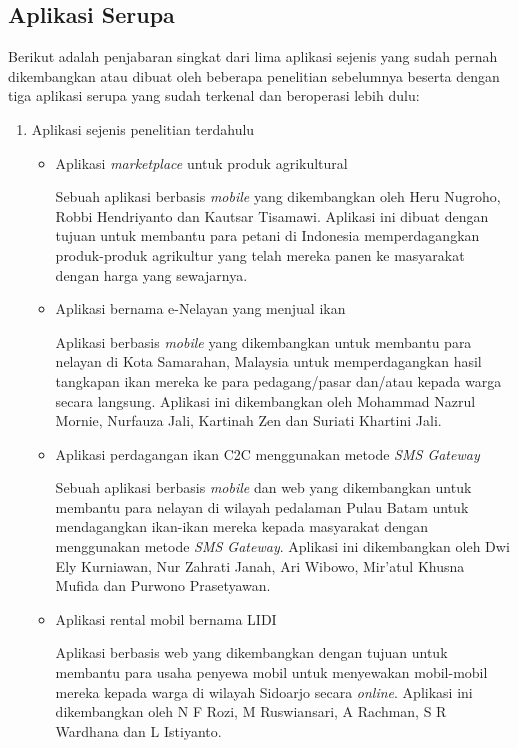 \documentclass[a4paper]{article}
\newcommand{\subbab}[1]{%
    \subsection{#1}%
    \setcounter{figure}{0}
    \setcounter{table}{0}
}
\begin{document}
\subbab{Aplikasi Serupa}
Berikut adalah penjabaran singkat dari lima aplikasi sejenis yang sudah pernah dikembangkan atau dibuat oleh beberapa penelitian sebelumnya beserta dengan tiga aplikasi serupa yang sudah terkenal dan beroperasi lebih dulu:

\begin{enumerate}
    \item Aplikasi sejenis penelitian terdahulu
    
    \begin{itemize}
        \item Aplikasi \textit{marketplace} untuk produk agrikultural
        
        Sebuah aplikasi berbasis \textit{mobile} yang dikembangkan oleh Heru Nugroho, Robbi Hendriyanto dan Kautsar Tisamawi. Aplikasi ini dibuat dengan tujuan untuk membantu para petani di Indonesia memperdagangkan produk-produk agrikultur yang telah mereka panen ke masyarakat dengan harga yang sewajarnya\autocite{agriculture-marketplace}. 
    
        \item Aplikasi bernama e-Nelayan yang menjual ikan
        
        Aplikasi berbasis \textit{mobile} yang dikembangkan untuk membantu para nelayan di Kota Samarahan, Malaysia untuk memperdagangkan hasil tangkapan ikan mereka ke para pedagang/pasar dan/atau kepada warga secara langsung. Aplikasi ini dikembangkan oleh Mohammad Nazrul Mornie, Nurfauza Jali, Kartinah Zen dan Suriati Khartini Jali\autocite[1-10]{fishes-marketplace}.
    
        \item Aplikasi perdagangan ikan C2C menggunakan metode \textit{SMS Gateway}
        
        Sebuah aplikasi berbasis \textit{mobile} dan web yang dikembangkan untuk membantu para nelayan di wilayah pedalaman Pulau Batam untuk mendagangkan ikan-ikan mereka kepada masyarakat dengan menggunakan metode \textit{SMS Gateway}. Aplikasi ini dikembangkan oleh Dwi Ely Kurniawan, Nur Zahrati Janah, Ari Wibowo, Mir'atul Khusna Mufida dan Purwono Prasetyawan\autocite{c2c-fish-marketplace}.
    
        \item Aplikasi rental mobil bernama LIDI
        
        Aplikasi berbasis web yang dikembangkan dengan tujuan untuk membantu para usaha penyewa mobil untuk menyewakan mobil-mobil mereka kepada warga di wilayah Sidoarjo secara \textit{online}. Aplikasi ini dikembangkan oleh N F Rozi, M Ruswiansari, A Rachman, S R Wardhana dan L Istiyanto\autocite{lidi-car-rental}. 
    

\end{itemize}
\end{enumerate}
\end{document}
